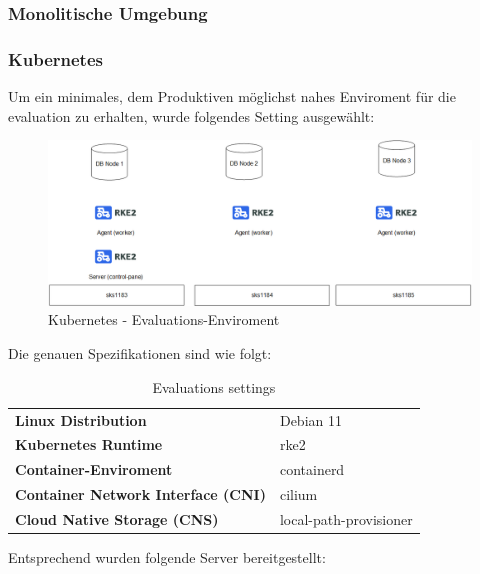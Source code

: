 
\subsubsection{Monolitische Umgebung}
\subsubsection{Kubernetes}
\begin{flushleft}
    Um ein minimales, dem Produktiven möglichst nahes Enviroment für die evaluation zu erhalten, wurde folgendes Setting ausgewählt:
    \begin{figure}[H]
        \centering
        \includegraphics[width=1\linewidth]{source/implementation/evaluation/platforms/evaluation_enviroment_rke2}
        \caption{Kubernetes - Evaluations-Enviroment}
        \label{fig:k8s_evalution_enviroment}
    \end{figure}
\end{flushleft}
\begin{flushleft}
    Die genauen Spezifikationen sind wie folgt:
    \begin{table}[H]
    \begin{tabular}{ll}
    \textbf{Linux Distribution}                & Debian 11              \\
    \textbf{Kubernetes Runtime}                & rke2                   \\
    \textbf{Container-Enviroment}              & containerd             \\
    \textbf{Container Network Interface (CNI)} & cilium                 \\
    \textbf{Cloud Native Storage (CNS)}        & local-path-provisioner
    \end{tabular}
    \caption{Evaluations settings}
    \label{tab:evaluation-setting}
    \end{table}
\end{flushleft}

\begin{flushleft}
    Entsprechend wurden folgende Server bereitgestellt:
    
\end{flushleft}
